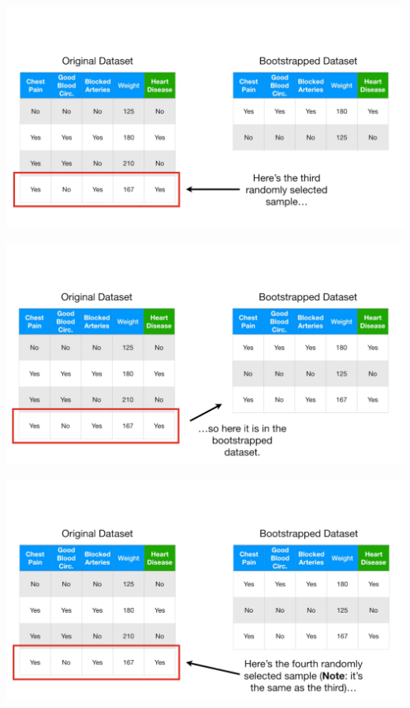 \documentclass[
  ignorenonframetext,
]{beamer}
\begin{document}
\begin{frame}{}
\protect\hypertarget{section-17}{}
\includegraphics{images/r18.png}
\end{frame}

\begin{frame}{}
\protect\hypertarget{section-18}{}
\includegraphics{images/r19.png}
\end{frame}

\begin{frame}{}
\protect\hypertarget{section-19}{}
\includegraphics{images/r20.png}
\end{frame}
\end{document}
